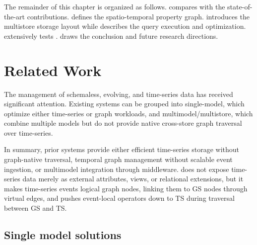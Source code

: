 The remainder of this chapter is organized as follows.
 compares \ourapproach with the state-of-the-art contributions.
 defines the spatio-temporal property graph.
 introduces the multistore storage layout while
 describes the query execution and optimization.
 extensively tests \ourapproach.
 draws the conclusion and future research directions.

\section{Related Work}\label{sec:related}
The management of schemaless, evolving, and time-series data has received significant attention.
Existing systems can be grouped into single-model, which optimize either time-series or graph workloads, and multimodel/multistore, which combine multiple models but do not provide native cross-store graph traversal over time-series.

In summary, prior systems provide either efficient time-series storage without graph-native traversal, temporal graph management without scalable event ingestion, or multimodel integration through middleware.
\ourapproach does not expose time-series data merely as external attributes, views, or relational extensions, but it makes time-series events logical graph nodes, linking them to GS nodes through virtual edges, and pushes event-local operators down to TS during traversal between GS and TS.
\subsection{Single model solutions}

